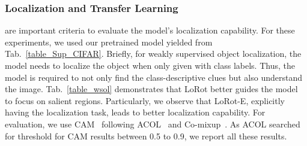 \endgroup















\subsubsection{Localization and Transfer Learning}
\label{subsection:highlevelunderstanding}
 are important criteria to evaluate the model's localization capability. 
For these experiments, we used our pretrained model yielded from Tab.~\ref{table_Sup_CIFAR}.
Briefly, for weakly supervised object localization, the model needs to localize the object when only given with class labels.
Thus, the model is required to not only find the class-descriptive clues but also understand the image.
Tab.~\ref{table_wsol} demonstrates that LoRot better guides the model to focus on salient regions. Particularly, we observe that LoRot-E, explicitly having the localization task, leads to better localization capability. For evaluation, we use CAM~\cite{zhou2016learning} following ACOL~\cite{zhang2018adversarial} and Co-mixup~\cite{kim2021co}. As ACOL searched for threshold for CAM results between 0.5 to 0.9, we report all these results. 
